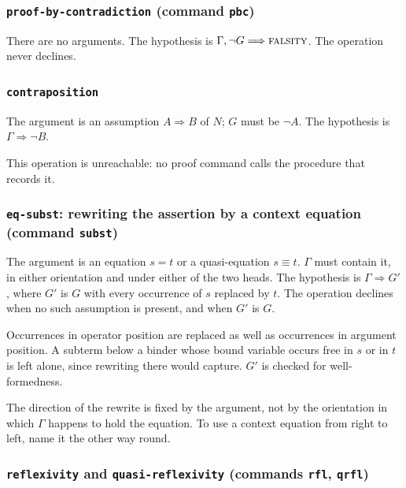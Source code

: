 \subsubsection*{\texttt{proof-by-contradiction} (command \texttt{pbc})}

There are no arguments.  The hypothesis is
$\Gamma, \neg G \Longrightarrow \textsc{falsity}$.  The operation never
declines.

\subsubsection*{\texttt{contraposition}}

The argument is an assumption $A \Rightarrow B$ of $N$; $G$ must be
$\neg A$.  The hypothesis is $\Gamma \Longrightarrow \neg B$.

This operation is unreachable: no proof command calls the procedure that
records it.

\subsubsection*{\texttt{eq-subst}: rewriting the assertion by a context
  equation (command \texttt{subst})}

The argument is an equation $s = t$ or a quasi-equation $s \equiv t$.
$\Gamma$ must contain it, in either orientation and under either of the
two heads.  The hypothesis is $\Gamma \Longrightarrow G'$, where $G'$ is
$G$ with every occurrence of $s$ replaced by $t$.  The operation declines
when no such assumption is present, and when $G'$ is $G$.

Occurrences in operator position are replaced as well as occurrences in
argument position.  A subterm below a binder whose bound variable occurs
free in $s$ or in $t$ is left alone, since rewriting there would capture.
$G'$ is checked for well-formedness.

\begin{remark}
The direction of the rewrite is fixed by the argument, not by the
orientation in which $\Gamma$ happens to hold the equation.  To use a
context equation from right to left, name it the other way round.
\end{remark}

\subsubsection*{\texttt{reflexivity} and \texttt{quasi-reflexivity}
  (commands \texttt{rfl}, \texttt{qrfl})}


